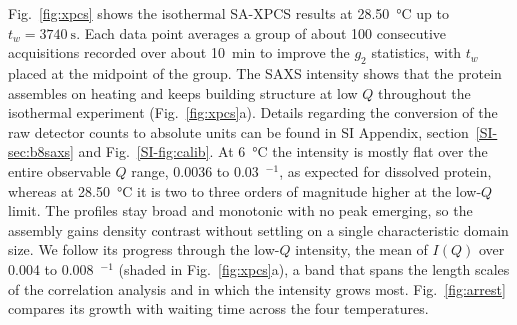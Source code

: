 \documentclass[journal=nalefd,manuscript=letter,layout=traditional]{achemso}
\newcommand{\Ainv}{\text{\AA}$^{-1}$}
\begin{document}
Fig.~\ref{fig:xpcs} shows the isothermal SA-XPCS results at \SI{28.50}{\degreeCelsius} up to $t_w=\SI{3740}{\second}$. Each data point averages a group of about 100 consecutive acquisitions recorded over about \SI{10}{\minute} to improve the $g_2$ statistics, with $t_w$ placed at the midpoint of the group. The SAXS intensity shows that the protein assembles on heating and keeps building structure at low $Q$ throughout the isothermal experiment (Fig.~\ref{fig:xpcs}a). Details regarding the conversion of the raw detector counts to absolute units can be found in SI Appendix, section~\ref*{SI-sec:b8saxs} and Fig.~\ref*{SI-fig:calib}. At \SI{6}{\degreeCelsius} the intensity is mostly flat over the entire observable $Q$ range, 0.0036 to 0.03~\Ainv, as expected for dissolved protein, whereas at \SI{28.50}{\degreeCelsius} it is two to three orders of magnitude higher at the low-$Q$ limit. The profiles stay broad and monotonic with no peak emerging, so the assembly gains density contrast without settling on a single characteristic domain size. We follow its progress through the low-$Q$ intensity, the mean of $I(Q)$ over 0.004 to 0.008~\Ainv{} (shaded in Fig.~\ref{fig:xpcs}a), a band that spans the length scales of the correlation analysis and in which the intensity grows most. Fig.~\ref{fig:arrest} compares its growth with waiting time across the four temperatures.
\end{document}
